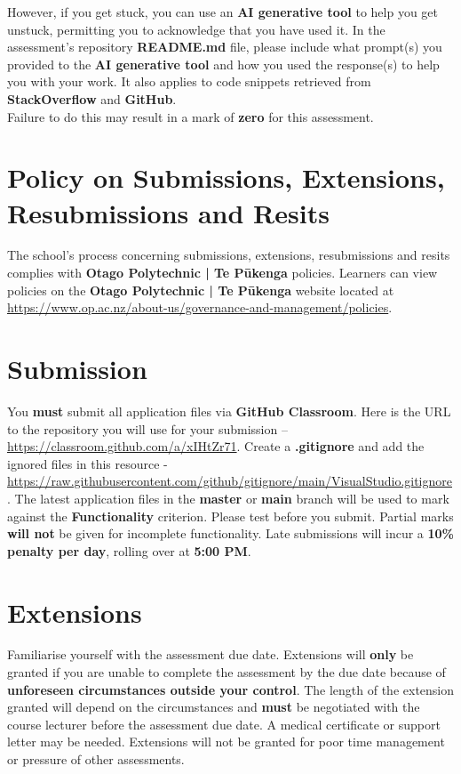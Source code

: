 \documentclass{article}
\begin{document}
 However, if you get stuck, you can use an \textbf{AI generative tool} to help you get unstuck, permitting you to acknowledge that you have used it. In the assessment's repository \textbf{README.md} file, please include what prompt(s) you provided to the \textbf{AI generative tool} and how you used the response(s) to help you with your work. It also applies to code snippets retrieved from \textbf{StackOverflow} and \textbf{GitHub}. \\
 
 Failure to do this may result in a mark of \textbf{zero} for this assessment. 

\section*{Policy on Submissions, Extensions, Resubmissions and Resits}
The school's process concerning submissions, extensions, resubmissions and resits complies with \textbf{Otago Polytechnic | Te Pūkenga} policies. Learners can view policies on the \textbf{Otago Polytechnic | Te Pūkenga} website located at \href{https://www.op.ac.nz/about-us/governance-and-management/policies}{https://www.op.ac.nz/about-us/governance-and-management/policies}.

\section*{Submission}
You \textbf{must} submit all application files via \textbf{GitHub Classroom}. Here is the URL to the repository you will use for your submission – \href{https://classroom.github.com/a/xIHtZr71}{https://classroom.github.com/a/xIHtZr71}.  Create a \textbf{.gitignore} and add the ignored files in this resource - \href{https://raw.githubusercontent.com/github/gitignore/main/VisualStudio.gitignore}{https://raw.githubusercontent.com/github/gitignore/main/VisualStudio.gitignore}. The latest application files in the \textbf{master} or \textbf{main} branch will be used to mark against the \textbf{Functionality} criterion. Please test before you submit. Partial marks \textbf{will not} be given for incomplete functionality. Late submissions will incur a \textbf{10\% penalty per day}, rolling over at \textbf{5:00 PM}.

\section*{Extensions}
Familiarise yourself with the assessment due date. Extensions will \textbf{only} be granted if you are unable to complete the assessment by the due date because of \textbf{unforeseen circumstances outside your control}. The length of the extension granted will depend on the circumstances and \textbf{must} be negotiated with the course lecturer before the assessment due date. A medical certificate or support letter may be needed. Extensions will not be granted for poor time management or pressure of other assessments.
\end{document}
